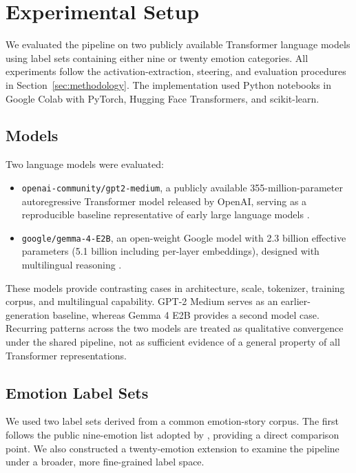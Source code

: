 \section{Experimental Setup}

We evaluated the pipeline on two publicly available Transformer language models using label sets containing either nine or twenty
emotion categories. All experiments follow the activation-extraction, steering, and evaluation procedures in
Section~\ref{sec:methodology}. The implementation used Python notebooks in Google Colab with PyTorch, Hugging Face Transformers,
and scikit-learn.

\subsection{Models}
Two language models were evaluated:

\begin{itemize}
    \item \texttt{openai-community/gpt2-medium}, a publicly available 355-million-parameter autoregressive Transformer model released by OpenAI, serving as a reproducible baseline representative of early large language models \cite{radford_language_2019}.
    \item \texttt{google/gemma-4-E2B}, an open-weight Google model with 2.3 billion effective parameters (5.1 billion including per-layer embeddings), designed with multilingual reasoning \cite{team_gemma_2026}.
\end{itemize}

These models provide contrasting cases in architecture, scale, tokenizer, training corpus, and multilingual capability. 
GPT-2 Medium serves as an earlier-generation baseline, whereas Gemma 4 E2B provides a second model case.
Recurring patterns across the two models are treated as qualitative convergence under the shared pipeline, not as 
sufficient evidence of a general property of all Transformer representations.

\subsection{Emotion Label Sets}

We used two label sets derived from a common emotion-story corpus. The first follows the public nine-emotion list adopted by
\cite{hsieh_replicating_2026}, providing a direct comparison point. We also constructed a twenty-emotion extension to examine
the pipeline under a broader, more fine-grained label space.

